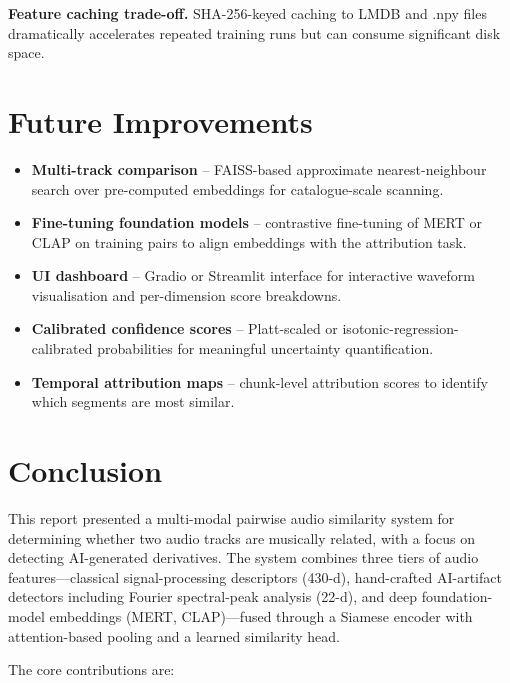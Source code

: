 \documentclass[11pt,a4paper]{article}
\begin{document}
\textbf{Feature caching trade-off.} SHA-256-keyed caching to LMDB and .npy files dramatically accelerates repeated training runs but can consume significant disk space.


\section{Future Improvements}

\begin{itemize}[nosep]
  \item \textbf{Multi-track comparison} -- FAISS-based approximate nearest-neighbour search over pre-computed embeddings for catalogue-scale scanning.
  \item \textbf{Fine-tuning foundation models} -- contrastive fine-tuning of MERT or CLAP on training pairs to align embeddings with the attribution task.
  \item \textbf{UI dashboard} -- Gradio or Streamlit interface for interactive waveform visualisation and per-dimension score breakdowns.
  \item \textbf{Calibrated confidence scores} -- Platt-scaled or isotonic-regression-calibrated probabilities for meaningful uncertainty quantification.
  \item \textbf{Temporal attribution maps} -- chunk-level attribution scores to identify which segments are most similar.
\end{itemize}


\section{Conclusion}

This report presented a multi-modal pairwise audio similarity system for determining whether two audio tracks are musically related, with a focus on detecting AI-generated derivatives. The system combines three tiers of audio features---classical signal-processing descriptors (430-d), hand-crafted AI-artifact detectors including Fourier spectral-peak analysis (22-d), and deep foundation-model embeddings (MERT, CLAP)---fused through a Siamese encoder with attention-based pooling and a learned similarity head.

The core contributions are:
\end{document}
